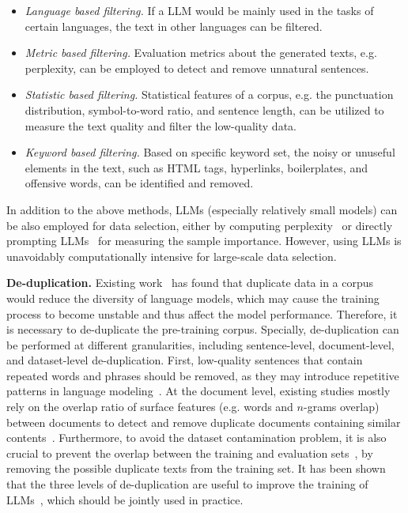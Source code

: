 \begin{itemize}[leftmargin=0.5cm, itemsep=5pt]
\item \emph{Language based filtering.} If a LLM would  be mainly used  in the tasks of certain languages, the text in other languages can be filtered.

\item \emph{Metric based filtering.} Evaluation metrics about the generated texts, e.g. perplexity, can be employed to detect and remove unnatural sentences.

\item \emph{Statistic based  filtering.} Statistical features of a corpus, e.g. the punctuation distribution, symbol-to-word ratio, and sentence length, can be utilized to measure the text quality and filter the low-quality data.

\item \emph{Keyword based filtering.} Based on specific keyword set, the noisy or unuseful elements in the text, such as HTML tags, hyperlinks, boilerplates, and offensive words, can be identified and removed. 
\end{itemize}

In addition to the above methods, LLMs (especially relatively small models) can be also employed for data selection, either by computing perplexity~\cite{Marion-arxiv-2023-data_pruning} or directly prompting LLMs~\cite{Sachdeva-arxiv-2024-askllm} for measuring the sample importance. However,  using LLMs is unavoidably computationally intensive for large-scale data selection.

\textbf{De-duplication.}
Existing work~\cite{Hernandez-arxiv-2022-Scaling} has found that duplicate data in a corpus would reduce the diversity of language models, which may  cause the training process to become unstable and thus affect the model performance. Therefore, it is necessary to de-duplicate the pre-training corpus. Specially, de-duplication can be performed at different granularities, including sentence-level, document-level, and dataset-level de-duplication. First,  low-quality sentences that contain repeated words and phrases should be removed,  as they may introduce repetitive patterns in language modeling~\cite{Holtzman-2019-ICLR-The}. At the document level, existing studies mostly rely on the overlap ratio of surface features (e.g. words and $n$-grams overlap) between documents to detect and remove duplicate documents containing similar contents~\cite{Rae-arxiv-2021-Scaling,Touvron-arxiv-2023-LLaMA,Scao-arxiv-2022-BLOOM,Lee-ACL-2022-Deduplicating}. Furthermore, to avoid the dataset contamination problem, it is also crucial to prevent the overlap between the training and evaluation sets~\cite{Chowdhery-arxiv-2022-PaLM}, by removing the possible duplicate texts  from the training set. It has been shown that the three levels of de-duplication are useful to improve the training of LLMs~\cite{Carlini-arxiv-2022-Quantifying,Chowdhery-arxiv-2022-PaLM}, which should be jointly used in practice. 

